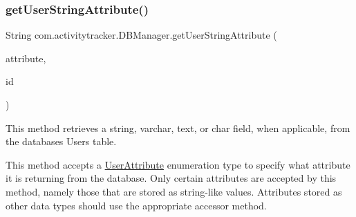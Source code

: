 \subsubsection{\texorpdfstring{get\+User\+String\+Attribute()}{getUserStringAttribute()}}
{\footnotesize\ttfamily String com.\+activitytracker.\+D\+B\+Manager.\+get\+User\+String\+Attribute (\begin{DoxyParamCaption}\item[{final \mbox{\hyperlink{enumcom_1_1activitytracker_1_1_user_attribute}{User\+Attribute}}}]{attribute,  }\item[{final int}]{id }\end{DoxyParamCaption})}

This method retrieves a string, varchar, text, or char field, when applicable, from the database\textquotesingle{}s Users table.

This method accepts a \mbox{\hyperlink{enumcom_1_1activitytracker_1_1_user_attribute}{User\+Attribute}} enumeration type to specify what attribute it is returning from the database. Only certain attributes are accepted by this method, namely those that are stored as string-\/like values. Attributes stored as other data types should use the appropriate accessor method.


